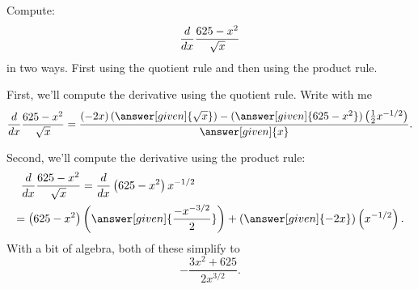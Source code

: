 \documentclass{ximera}
\begin{document}
\begin{example}
Compute: 
\[
\frac{d}{\mathop{}\!d x} \frac{625-x^2}{\sqrt{x}}
\] 
in two ways. First using the quotient rule and then using the product
rule.
\begin{explanation}
First, we'll compute the derivative using the quotient rule. Write with me
\[
\ddx \frac{625-x^2}{\sqrt{x}} = \frac{\left(-2x\right)\left(\answer[given]{\sqrt{x}}\right) - (\answer[given]{625-x^2})\left(\frac{1}{2}x^{-1/2}\right)}{\answer[given]{x}}.
\]

Second, we'll compute the derivative using the product rule:
\begin{align*}
\ddx \frac{625-x^2}{\sqrt{x}} &= \ddx \left(625-x^2\right)x^{-1/2}\\
=\left(625-x^2\right)&\left(\answer[given]{\frac{-x^{-3/2}}{2}}\right)+ (\answer[given]{-2x})\left(x^{-1/2}\right).
\end{align*}
With a bit of algebra, both of these simplify to
\[
-\frac{3x^2+625}{2x^{3/2}}.
\]
\end{explanation}
\end{example}
\end{document}
